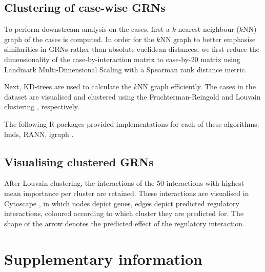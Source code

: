 \subsection{Clustering of case-wise GRNs}
To perform downstream analysis on the cases, first a $k$-nearest neighbour ($k$NN) graph of the cases is computed.
In order for the $k$NN graph to better emphasise similarities in GRNs rather than absolute euclidean distances, we first reduce the dimensionality of the case-by-interaction matrix to case-by-20 matrix using Landmark Multi-Dimensional Scaling \cite{lee_landmarkmdsensemble_2009} with a Spearman rank distance metric.  

Next, KD-trees are used to calculate the $k$NN graph efficiently. The cases in the dataset are visualised and clustered using the Fruchterman-Reingold \cite{fruchterman_graphdrawingforcedirected_1991} and Louvain clustering \cite{blondel_fastunfoldingcommunities_2008}, respectively.

The following R packages provided implementations for each of these algorithms: lmds, RANN, igraph \cite{csardi_igraphsoftwarepackage_2006}.


\subsection{Visualising clustered GRNs}
After Louvain clustering, the interactions of the 50 interactions with highest mean importance per cluster are retained. These interactions are visualised in Cytoscape \cite{shannon_cytoscapesoftwareenvironment_2003}, in which nodes depict genes, edges depict predicted regulatory interactions, coloured according to which cluster they are predicted for. The shape of the arrow denotes the predicted effect of the regulatory interaction.

%

\section{Supplementary information}


